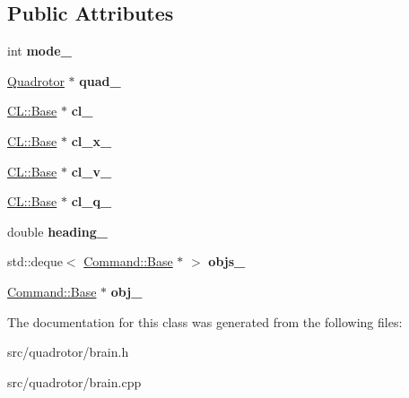 \subsection*{Public Attributes}
\begin{DoxyCompactItemize}
\item 
\hypertarget{classBrain_a909cbf59a243e11be1e052dfebc1039f}{
int {\bfseries mode\_\-}}
\label{classBrain_a909cbf59a243e11be1e052dfebc1039f}

\item 
\hypertarget{classBrain_a522cd8559636661c43d07aa86e9803b7}{
\hyperlink{classQuadrotor}{Quadrotor} $\ast$ {\bfseries quad\_\-}}
\label{classBrain_a522cd8559636661c43d07aa86e9803b7}

\item 
\hypertarget{classBrain_a0897765690afb51c87d037329e968464}{
\hyperlink{classCL_1_1Base}{CL::Base} $\ast$ {\bfseries cl\_\-}}
\label{classBrain_a0897765690afb51c87d037329e968464}

\item 
\hypertarget{classBrain_aa408572807d4347bd4a7e3bee61ee75e}{
\hyperlink{classCL_1_1Base}{CL::Base} $\ast$ {\bfseries cl\_\-x\_\-}}
\label{classBrain_aa408572807d4347bd4a7e3bee61ee75e}

\item 
\hypertarget{classBrain_af283fe2f0a5ee9cb117cc393a0028993}{
\hyperlink{classCL_1_1Base}{CL::Base} $\ast$ {\bfseries cl\_\-v\_\-}}
\label{classBrain_af283fe2f0a5ee9cb117cc393a0028993}

\item 
\hypertarget{classBrain_a962d23b524a3bf3668eb3f6bdf5be20e}{
\hyperlink{classCL_1_1Base}{CL::Base} $\ast$ {\bfseries cl\_\-q\_\-}}
\label{classBrain_a962d23b524a3bf3668eb3f6bdf5be20e}

\item 
\hypertarget{classBrain_a839638574da324a41c61edd5375a7261}{
double {\bfseries heading\_\-}}
\label{classBrain_a839638574da324a41c61edd5375a7261}

\item 
\hypertarget{classBrain_a9e99f325288e528a5893ff37dce19ec7}{
std::deque$<$ \hyperlink{classCommand_1_1Base}{Command::Base} $\ast$ $>$ {\bfseries objs\_\-}}
\label{classBrain_a9e99f325288e528a5893ff37dce19ec7}

\item 
\hypertarget{classBrain_add3bf09bdcdd4cfc8008d076b1859f5f}{
\hyperlink{classCommand_1_1Base}{Command::Base} $\ast$ {\bfseries obj\_\-}}
\label{classBrain_add3bf09bdcdd4cfc8008d076b1859f5f}

\end{DoxyCompactItemize}


The documentation for this class was generated from the following files:\begin{DoxyCompactItemize}
\item 
src/quadrotor/brain.h\item 
src/quadrotor/brain.cpp\end{DoxyCompactItemize}
